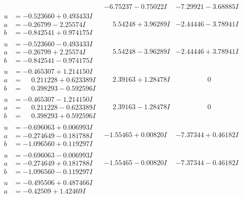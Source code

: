 \documentclass[1p]{elsarticle_modified}
\theoremstyle{definition}
\begin{document}
$$\begin{array}{c|c|c}
 & -6.75237 - 0.75022 I & -7.29921 - 3.68885 I \\ \hline\begin{aligned}
u &= -0.523660 + 0.493433 I \\
a &= -0.26799 - 2.25574 I \\
b &= -0.842541 + 0.974175 I\end{aligned}
 & \phantom{-}5.54248 + 3.96289 I & -2.44446 - 3.78941 I \\ \hline\begin{aligned}
u &= -0.523660 - 0.493433 I \\
a &= -0.26799 + 2.25574 I \\
b &= -0.842541 - 0.974175 I\end{aligned}
 & \phantom{-}5.54248 - 3.96289 I & -2.44446 + 3.78941 I \\ \hline\begin{aligned}
u &= -0.465307 + 1.214150 I \\
a &= \phantom{-}0.211228 + 0.623389 I \\
b &= \phantom{-}0.398293 - 0.592596 I\end{aligned}
 & \phantom{-}2.39163 + 1.28478 I & \phantom{-0.000000 } 0 \\ \hline\begin{aligned}
u &= -0.465307 - 1.214150 I \\
a &= \phantom{-}0.211228 - 0.623389 I \\
b &= \phantom{-}0.398293 + 0.592596 I\end{aligned}
 & \phantom{-}2.39163 - 1.28478 I & \phantom{-0.000000 } 0 \\ \hline\begin{aligned}
u &= -0.696063 + 0.006993 I \\
a &= -0.274649 - 0.181788 I \\
b &= -1.096560 + 0.119297 I\end{aligned}
 & -1.55465 + 0.00820 I & -7.37344 + 0.46182 I \\ \hline\begin{aligned}
u &= -0.696063 - 0.006993 I \\
a &= -0.274649 + 0.181788 I \\
b &= -1.096560 - 0.119297 I\end{aligned}
 & -1.55465 - 0.00820 I & -7.37344 - 0.46182 I \\ \hline\begin{aligned}
u &= -0.495506 + 0.487466 I \\
a &= -0.42509 + 1.42469 I \\

\end{aligned}
\end{array}$$
\end{document}
